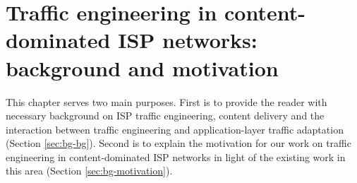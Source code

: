 \chapter{Traffic engineering in content-dominated ISP networks: background and motivation}
\label{ch:te-background}

This chapter serves two main purposes. First is to provide the reader with necessary background on ISP traffic engineering, content delivery and the interaction between traffic engineering and application-layer traffic adaptation (Section \ref{sec:bg-bg}). Second is to explain the motivation for our work on traffic engineering in content-dominated ISP networks in light of the existing work in this area (Section \ref{sec:bg-motivation}).




%






